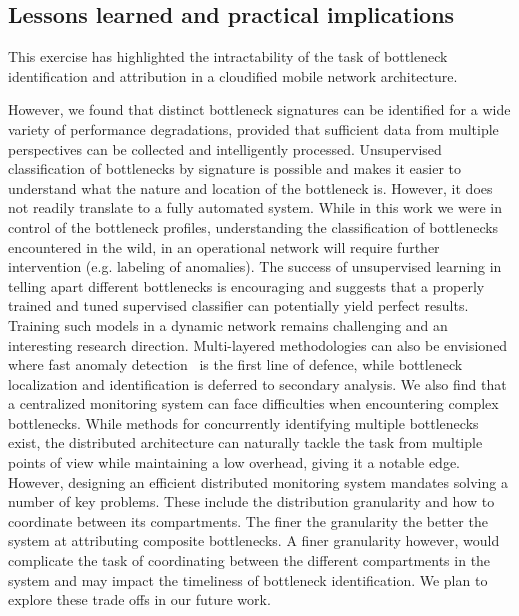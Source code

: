 \documentclass[journal,comsoc]{IEEEtran}
\begin{document}
% 



% 
\subsection{Lessons learned and practical implications}

This exercise has highlighted the intractability of the task of bottleneck identification and attribution in a cloudified mobile network architecture.

However, we found that distinct bottleneck signatures can be identified for a wide variety of performance degradations, provided that sufficient data from multiple perspectives can be collected and intelligently processed.
Unsupervised classification of bottlenecks by signature is possible and makes it easier to understand what the nature and location of the bottleneck is. 
However, it does not readily translate to a fully automated system.
While in this work we were in control of the bottleneck profiles, understanding the classification of bottlenecks encountered in the wild, in an operational network will require further intervention (e.g. labeling of anomalies).
The success of unsupervised learning in telling apart different bottlenecks is encouraging and suggests that a properly trained and tuned supervised classifier can potentially yield perfect results. 
Training such models in a dynamic network remains challenging and an interesting research direction.
Multi-layered methodologies can also be envisioned where fast anomaly detection~\cite{ahmed2016survey} is the first line of defence, while bottleneck localization and identification is deferred to secondary analysis.
We also find that a centralized monitoring system can face difficulties when encountering complex bottlenecks.
While methods for concurrently identifying multiple bottlenecks exist, the distributed architecture can naturally tackle the task from multiple points of view while maintaining a low overhead, giving it a notable edge.
However, designing an efficient distributed monitoring system mandates solving a number of key problems.
These include the distribution granularity and how to coordinate between its compartments.
The finer the granularity the better the system at attributing composite bottlenecks.
A finer granularity however, would complicate the task of coordinating between the different compartments in the system and may impact the timeliness of bottleneck identification.
We plan to explore these trade offs in our future work.
\end{document}
